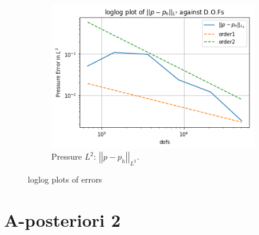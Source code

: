 \documentclass[12pt,a4paper]{article}
\theoremstyle{definition}
\begin{document}
\begin{figure}[H]
\begin{subfigure}[b]{.45\linewidth}
		\includegraphics[width=\linewidth]{p_h_L2}
		\caption{Pressure $L^2$: $\left|\left|p-p_h\right|\right|_{L^2}$.}
		\label{fig_pL2}
	\end{subfigure}
	\caption{loglog plots of errors }
	\label{fig_errors}
\end{figure}

\section{A-posteriori 2}
\end{document}
